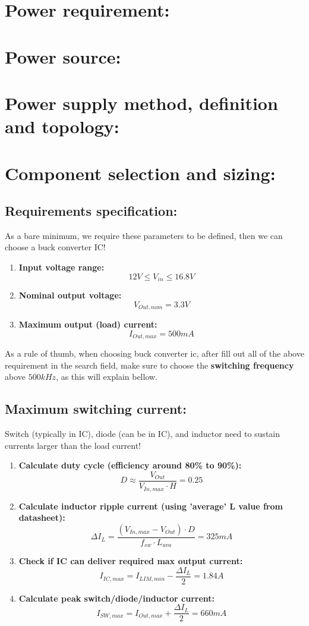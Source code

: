 \section{Power requirement:}
\section{Power source:}
\section{Power supply method, definition and topology:}
\section{Component selection and sizing:}
\subsection{Requirements specification:}
As a bare minimum, we require these parameters to be defined, then we can choose a buck converter IC!

\begin{enumerate}
	\item
	\textbf{Input voltage range:}
	\[ 12V \leq V_{in} \leq 16.8V \]
	
	\item
	\textbf{Nominal output voltage:}
	\[ V_{Out, nom} = 3.3V \]
	
	\item
	\textbf{Maximum output (load) current:}
	\[ I_{Out, max} = 500mA \]
\end{enumerate}

As a rule of thumb, when choosing buck converter ic, after fill out all of the above requirement in the search field, make sure to choose the \textbf{switching frequency} above $500kHz$, as this will explain bellow.

\subsection{Maximum switching current:}
Switch (typically in IC), diode (can be in IC), and inductor need to sustain currents larger than the load current!

\begin{enumerate}
	\item
	\textbf{Calculate duty cycle (efficiency around 80\% to 90\%):}
	\[ D \approx \frac{V_{Out}}{V_{In, max} \cdot H} = 0.25 \]
	
	\item 
	\textbf{Calculate inductor ripple current (using 'average' L value from datasheet):}
	\[ \Delta I_L = \frac{(V_{In, max} - V_{Out}) \cdot D}{f_{sw} \cdot L_{ava}} = 325mA \]
	
	\item 
	\textbf{Check if IC can deliver required max output current:}
	\[ I_{IC, max} = I_{LIM, min} - \frac{\Delta I_L}{2} = 1.84A \]
	
	\item 
	\textbf{Calculate peak switch/diode/inductor current:}
	\[ I_{SW, max} = I_{Out, max} + \frac{\Delta I_L}{2} = 660mA \]
\end{enumerate}

